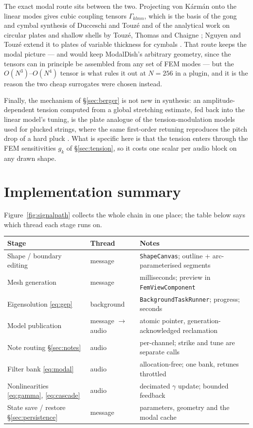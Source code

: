 \documentclass[11pt,a4paper]{article}
\newcommand{\code}[1]{\texttt{#1}}
\begin{document}
The exact modal route sits between the two. Projecting von K\'arm\'an onto
the linear modes gives cubic coupling tensors $\Gamma_{klmn}$, which is the
basis of the gong and cymbal synthesis of Ducceschi and Touz\'e
\cite{ducceschi-touze} and of the analytical work on circular plates and
shallow shells by Touz\'e, Thomas and Chaigne
\cite{touze-circular,thomas-shells}; Nguyen and Touz\'e extend it to plates
of variable thickness for cymbals \cite{nguyen-touze}. That route keeps the
modal picture --- and would keep ModalDish's arbitrary geometry, since the
tensors can in principle be assembled from any set of FEM modes --- but the
$O(N^3)$--$O(N^4)$ tensor is what rules it out at $N = 256$ in a plugin,
and it is the reason the two cheap surrogates were chosen instead.

Finally, the mechanism of \S\ref{sec:berger} is not new in synthesis: an
amplitude-dependent tension computed from a global stretching estimate, fed
back into the linear model's tuning, is the plate analogue of the
tension-modulation models used for plucked strings, where the same
first-order retuning reproduces the pitch drop of a hard pluck
\cite{tolonen}. What is specific here is that the tension enters through
the FEM sensitivities $g_k$ of \S\ref{sec:tension}, so it costs one scalar
per audio block on any drawn shape.

\section{Implementation summary}

Figure~\ref{fig:signalpath} collects the whole chain in one place;
the table below says which thread each stage runs on.

\begin{center}
\begin{tabular}{llp{7.2cm}}
\toprule
Stage & Thread & Notes \\
\midrule
Shape / boundary editing & message & \code{ShapeCanvas}; outline + arc-parameterised segments \\
Mesh generation & message & milliseconds; preview in \code{FemViewComponent} \\
Eigensolution \eqref{eq:gep} & background & \code{BackgroundTaskRunner}; progress; seconds \\
Model publication & message $\to$ audio & atomic pointer, generation-acknowledged reclamation \\
Note routing \S\ref{sec:notes} & audio & per-channel; strike and tune are separate calls \\
Filter bank \eqref{eq:modal} & audio & allocation-free; one bank, retunes throttled \\
Nonlinearities \eqref{eq:gamma}, \eqref{eq:cascade} & audio & decimated $\gamma$ update; bounded feedback \\
State save / restore \S\ref{sec:persistence} & message & parameters, geometry and the modal cache \\
\bottomrule
\end{tabular}
\end{center}
\end{document}
